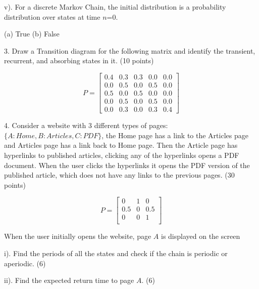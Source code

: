 \documentclass[6pt]{article}
\begin{document}
v). For a discrete Markov Chain, the initial distribution is a probability distribution over states at time $n$=0.

(a) True (b) False 

\vspace{10pt}

3. Draw a Transition diagram for the following matrix and identify the transient, recurrent, and absorbing states in it. (10 points)

\[
P = \begin{bmatrix}
0.4 & 0.3 & 0.3 & 0.0 & 0.0 \\
0.0 & 0.5 & 0.0 & 0.5 & 0.0 \\
0.5 & 0.0 & 0.5 & 0.0 & 0.0 \\
0.0 & 0.5 & 0.0 & 0.5 & 0.0 \\
0.0 & 0.3 & 0.0 & 0.3 & 0.4
\end{bmatrix}
\]

\vspace{10pt}

\vspace{800pt}

4. Consider a website with 3 different types of pages: $\{A: Home, B:Articles, C:PDF\}$, the Home page has a link to the Articles page and Articles page has a link back to Home page. Then the Article page has hyperlinks to published articles, clicking any of the hyperlinks opens a PDF document. When the user clicks the hyperlinks it opens the PDF version of the published article, which does not have any links to the previous pages. (30 points)

\[
P=
\left[ {\begin{array}{ccc}
0 & 1 & 0\\
0.5 & 0 & 0.5\\
0 & 0 & 1\\
\end{array} } \right]
\]

When the user initially opens the website, page $A$ is displayed on the screen

\vspace{10pt}

i). Find the periods of all the states and check if the chain is periodic or aperiodic. (6)

\vspace{1500pt}

ii). Find the expected return time to page $A$. (6)

\vspace{1500pt}
\end{document}
